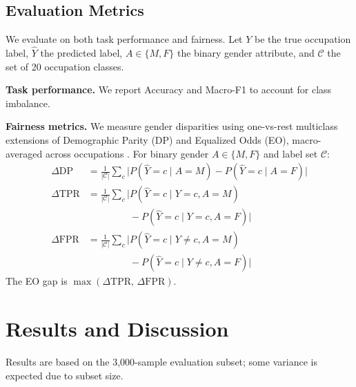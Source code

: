 \documentclass[11pt]{article}
\begin{document}
\subsection{Evaluation Metrics}
\label{sec:evaluation}

We evaluate on both task performance and fairness. Let $Y$ be the true
occupation label, $\hat{Y}$ the predicted label, $A \in \{M, F\}$ the
binary gender attribute, and $\mathcal{C}$ the set of 20 occupation classes.

\textbf{Task performance.} We report Accuracy and Macro-F1 to account for
class imbalance.

\textbf{Fairness metrics.} We measure gender disparities using one-vs-rest
multiclass extensions of Demographic Parity (DP) and Equalized Odds (EO),
macro-averaged across occupations \citep{hardt2016equality,dwork2012fairness}.
For binary gender $A\in\{M,F\}$ and label set $\mathcal{C}$:
{\small
\begin{align*}
\Delta\text{DP}  &= \tfrac{1}{|\mathcal{C}|}\!\sum_{c}\bigl|
    P(\hat{Y}{=}c\mid A{=}M) - P(\hat{Y}{=}c\mid A{=}F)\bigr|\\[2pt]
\Delta\text{TPR} &= \tfrac{1}{|\mathcal{C}|}\!\sum_{c}\bigl|
    P(\hat{Y}{=}c\mid Y{=}c,A{=}M)\\
    &\phantom{{}=\tfrac{1}{|\mathcal{C}|}\!\sum_{c}\bigl|}
    {}-P(\hat{Y}{=}c\mid Y{=}c,A{=}F)\bigr|\\[2pt]
\Delta\text{FPR} &= \tfrac{1}{|\mathcal{C}|}\!\sum_{c}\bigl|
    P(\hat{Y}{=}c\mid Y{\neq}c,A{=}M)\\
    &\phantom{{}=\tfrac{1}{|\mathcal{C}|}\!\sum_{c}\bigl|}
    {}-P(\hat{Y}{=}c\mid Y{\neq}c,A{=}F)\bigr|
\end{align*}}
The EO gap is $\max(\Delta\text{TPR},\,\Delta\text{FPR})$.

\section{Results and Discussion}

Results are based on the 3,000-sample evaluation subset; some variance is expected due to subset size.
\end{document}

